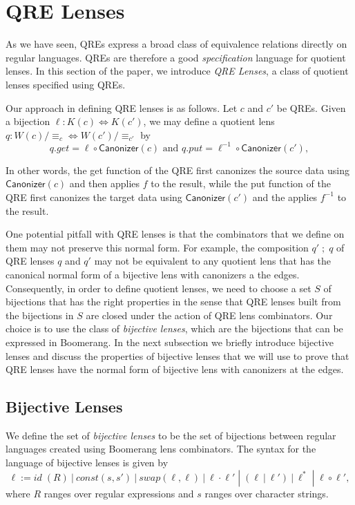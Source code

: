 \documentclass{svproc}
\newcommand{\kw}[1]{\ensuremath{\mathsf{#1}}}
\newcommand{\sep}{\ensuremath{\ | \ }}
\newcommand{\canonizer}{\ensuremath{\kw{Canonizer}}}
\newcommand{\eqrel}[1]{\ensuremath{\equiv_{#1}}}
\begin{document}
\section{QRE Lenses}
\label{QRE-lenses} 
As we have seen, QREs express a broad class of equivalence relations
directly on regular languages.  QREs are therefore a good \textit{specification}
language for quotient lenses. In this section of the paper, we introduce
\textit{QRE Lenses}, a class of quotient lenses specified using QREs.


Our approach in defining QRE lenses is as follows. Let $c$ and $c'$ be QREs. Given a
bijection $\ell : K(c) \Leftrightarrow K(c')$, we may define a quotient lens $q
: W(c)/\eqrel{c} \Leftrightarrow W(c')/\eqrel{c'}$ by
\begin{equation}\label{normalform}
q.get = \ell \circ \canonizer(c) \text{ and } q.put = \ell^{-1} \circ
\canonizer(c'),
\end{equation}

\noindent In other words, the get function of the QRE first canonizes the source
data using $\canonizer(c)$ and then applies $f$ to the result, while the
put function of the QRE first canonizes the target data using
$\canonizer(c')$ and the applies $f^{-1}$ to the result.

One potential pitfall with QRE lenses is that the combinators that
we define on them may not preserve this normal form. For example, the
composition $q' \; ; \; q$ of QRE lenses $q$ and $q'$ may not be equivalent to
any quotient lens that has the canonical normal form of a bijective lens with
canonizers a the edges. Consequently, in order to define quotient lenses, we
need to choose a set $S$ of bijections that has the right properties in the
sense that QRE lenses built from the bijections in $S$ are closed under the
action of QRE lens combinators. Our choice is to use the class of
\textit{bijective lenses}, which are the bijections that can be expressed in
Boomerang. In the next subsection we briefly introduce bijective lenses and
discuss the properties of bijective lenses that we will use to prove that QRE
lenses have the normal form of bijective lens with canonizers at the edges.

\subsection{Bijective Lenses}
We define the set of \textit{bijective lenses} to be the set of bijections
between regular languages created using Boomerang lens combinators.
The syntax for the language of bijective lenses is given by
$$\ell := \mathit{id} \; (R) \sep const(s, s') \sep  swap(\ell,
\ell) \sep \ell \cdot \ell' \; |  \; (\ell \sep \ell') \sep \ell^* \;
| \; \ell \circ \ell',$$ where $R$ ranges over regular expressions and $s$
ranges over character strings.
\end{document}
